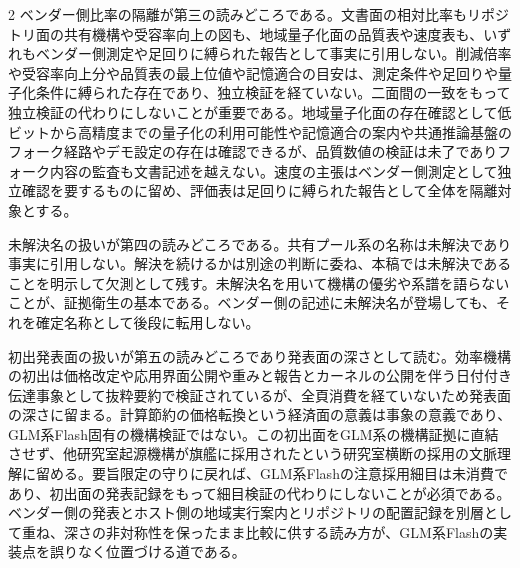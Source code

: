 \documentclass[lualatex,a4paper,10pt]{jlreq}
\begin{document}
\begin{multicols}{2}
ベンダー側比率の隔離が第三の読みどころである。文書面の相対比率もリポジトリ面の共有機構や受容率向上の図も、地域量子化面の品質表や速度表も、いずれもベンダー側測定や足回りに縛られた報告として事実に引用しない\autocite{zaidocs}\autocite{glm5github}\autocite{unslothglm}。削減倍率や受容率向上分や品質表の最上位値や記憶適合の目安は、測定条件や足回りや量子化条件に縛られた存在であり、独立検証を経ていない\autocite{zaidocs}\autocite{unslothglm}。二面間の一致をもって独立検証の代わりにしないことが重要である。地域量子化面の存在確認として低ビットから高精度までの量子化の利用可能性や記憶適合の案内や共通推論基盤のフォーク経路やデモ設定の存在は確認できるが、品質数値の検証は未了でありフォーク内容の監査も文書記述を越えない\autocite{unslothglm}。速度の主張はベンダー側測定として独立確認を要するものに留め、評価表は足回りに縛られた報告として全体を隔離対象とする\autocite{unslothglm}。

未解決名の扱いが第四の読みどころである。共有プール系の名称は未解決であり事実に引用しない\autocite{glm5github}。解決を続けるかは別途の判断に委ね、本稿では未解決であることを明示して欠測として残す。未解決名を用いて機構の優劣や系譜を語らないことが、証拠衛生の基本である。ベンダー側の記述に未解決名が登場しても、それを確定名称として後段に転用しない。

初出発表面の扱いが第五の読みどころであり発表面の深さとして読む。効率機構の初出は価格改定や応用界面公開や重みと報告とカーネルの公開を伴う日付付き伝達事象として抜粋要約で検証されているが、全頁消費を経ていないため発表面の深さに留まる\autocite{dsadebut}。計算節約の価格転換という経済面の意義は事象の意義であり、GLM系Flash固有の機構検証ではない。この初出面をGLM系の機構証拠に直結させず、他研究室起源機構が旗艦に採用されたという研究室横断の採用の文脈理解に留める\autocite{dsadebut}\autocite{glm5report}。要旨限定の守りに戻れば、GLM系Flashの注意採用細目は未消費であり、初出面の発表記録をもって細目検証の代わりにしないことが必須である。ベンダー側の発表とホスト側の地域実行案内とリポジトリの配置記録を別層として重ね、深さの非対称性を保ったまま比較に供する読み方が、GLM系Flashの実装点を誤りなく位置づける道である\autocite{glm5report}\autocite{glm53card}\autocite{zaidocs}\autocite{glm5github}\autocite{unslothglm}\autocite{dsadebut}。

\end{multicols}
\end{document}
